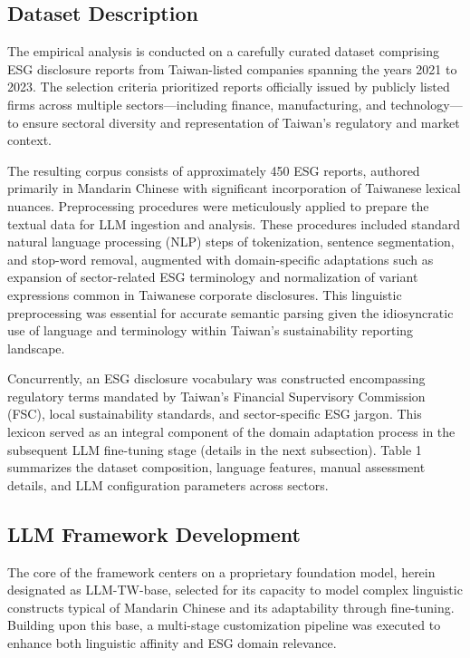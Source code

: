 \documentclass[
  12pt,
]{article}
\begin{document}
\subsection{Dataset Description}\label{dataset-description}

The empirical analysis is conducted on a carefully curated dataset
comprising ESG disclosure reports from Taiwan-listed companies spanning
the years 2021 to 2023. The selection criteria prioritized reports
officially issued by publicly listed firms across multiple
sectors---including finance, manufacturing, and technology---to ensure
sectoral diversity and representation of Taiwan's regulatory and market
context.

The resulting corpus consists of approximately 450 ESG reports, authored
primarily in Mandarin Chinese with significant incorporation of
Taiwanese lexical nuances. Preprocessing procedures were meticulously
applied to prepare the textual data for LLM ingestion and analysis.
These procedures included standard natural language processing (NLP)
steps of tokenization, sentence segmentation, and stop-word removal,
augmented with domain-specific adaptations such as expansion of
sector-related ESG terminology and normalization of variant expressions
common in Taiwanese corporate disclosures. This linguistic preprocessing
was essential for accurate semantic parsing given the idiosyncratic use
of language and terminology within Taiwan's sustainability reporting
landscape.

Concurrently, an ESG disclosure vocabulary was constructed encompassing
regulatory terms mandated by Taiwan's Financial Supervisory Commission
(FSC), local sustainability standards, and sector-specific ESG jargon.
This lexicon served as an integral component of the domain adaptation
process in the subsequent LLM fine-tuning stage (details in the next
subsection). Table 1 summarizes the dataset composition, language
features, manual assessment details, and LLM configuration parameters
across sectors.

\subsection{LLM Framework Development}\label{llm-framework-development}

The core of the framework centers on a proprietary foundation model,
herein designated as LLM-TW-base, selected for its capacity to model
complex linguistic constructs typical of Mandarin Chinese and its
adaptability through fine-tuning. Building upon this base, a multi-stage
customization pipeline was executed to enhance both linguistic affinity
and ESG domain relevance.
\end{document}
